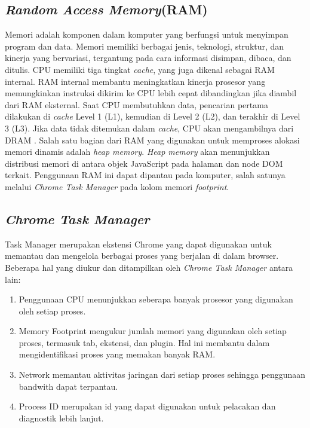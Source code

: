 \subsection{\textit{Random Access Memory}(RAM)}
Memori adalah komponen dalam komputer yang berfungsi untuk menyimpan program dan data. Memori memiliki berbagai jenis, teknologi, struktur, dan kinerja yang bervariasi, tergantung pada cara informasi disimpan, dibaca, dan ditulis. CPU memiliki tiga tingkat \textit{cache}, yang juga dikenal sebagai RAM internal. RAM internal membantu meningkatkan kinerja prosesor yang memungkinkan instruksi dikirim ke CPU lebih cepat dibandingkan jika diambil dari RAM eksternal. Saat CPU membutuhkan data, pencarian pertama dilakukan di \textit{cache} Level 1 (L1), kemudian di Level 2 (L2), dan terakhir di Level 3 (L3). Jika data tidak ditemukan dalam \textit{cache}, CPU akan mengambilnya dari DRAM \cite{Nurwarsito}. Salah satu bagian dari RAM yang digunakan untuk memproses alokasi memori dinamis adalah \textit{heap memory}. \textit{Heap memory} akan menunjukkan distribusi memori di antara objek JavaScript pada halaman dan node DOM terkait. Penggunaan RAM ini dapat dipantau pada komputer, salah satunya melalui \textit{Chrome Task Manager} pada kolom memori \textit{footprint}. 

\subsection{\textit{Chrome Task Manager}}
Task Manager merupakan ekstensi Chrome yang dapat digunakan untuk memantau dan mengelola berbagai proses yang berjalan di dalam browser. Beberapa hal yang diukur dan ditampilkan oleh \textit{Chrome Task Manager} antara lain:
\begin{enumerate}
	\item Penggunaan CPU menunjukkan seberapa banyak prosesor yang digunakan oleh setiap proses. 
	\item Memory Footprint mengukur jumlah memori yang digunakan oleh setiap proses, termasuk tab, ekstensi, dan plugin. Hal ini membantu dalam mengidentifikasi proses yang memakan banyak RAM.
	\item Network memantau aktivitas jaringan dari setiap proses sehingga penggunaan bandwith dapat terpantau. 
	\item Process ID merupakan id yang dapat digunakan untuk pelacakan dan diagnostik lebih lanjut.
\end{enumerate}
